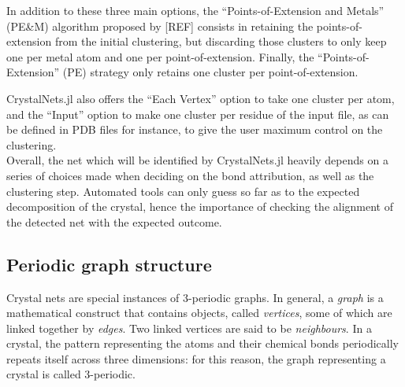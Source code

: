 \documentclass[main.tex]{subfiles}
\begin{document}
In addition to these three main options, the ``Points-of-Extension and Metals'' (PE\&M) algorithm proposed by [REF] consists in retaining the points-of-extension from the initial clustering, but discarding those clusters to only keep one per metal atom and one per point-of-extension. Finally, the ``Points-of-Extension'' (PE) strategy only retains one cluster per point-of-extension.

CrystalNets.jl also offers the ``Each Vertex'' option to take one cluster per atom, and the ``Input'' option to make one cluster per residue of the input file, as can be defined in PDB files for instance, to give the user maximum control on the clustering.\\

Overall, the net which will be identified by CrystalNets.jl heavily depends on a series of choices made when deciding on the bond attribution, as well as the clustering step. Automated tools can only guess so far as to the expected decomposition of the crystal, hence the importance of checking the alignment of the detected net with the expected outcome.


\subsection{Periodic graph structure}

\label{periodicgraphs}



Crystal nets are special instances of 3-periodic graphs. In general, a \emph{graph} is a mathematical construct that contains objects, called \emph{vertices}, some of which are linked together by \emph{edges}. Two linked vertices are said to be \emph{neighbours}. In a crystal, the pattern representing the atoms and their chemical bonds periodically repeats itself across three dimensions: for this reason, the graph representing a crystal is called 3-periodic.
\end{document}
